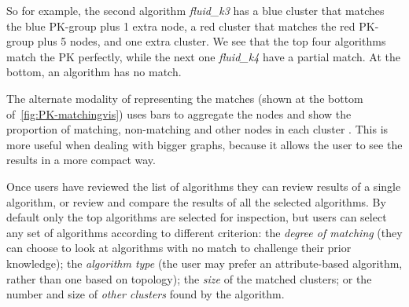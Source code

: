 So for example, the second algorithm \emph{fluid\_k3} has a blue cluster that matches the blue PK-group plus 1 extra node, a red cluster that matches the red PK-group plus 5 nodes, and one extra cluster.  We see that the top four algorithms match the PK perfectly, while the next one \emph{fluid\_k4}  have a partial match. At the bottom, an algorithm has no match.

The alternate modality of representing the matches (shown at the bottom of~\autoref{fig:PK-matchingvis}) uses bars to aggregate the nodes and show the proportion of matching, non-matching and other nodes in each cluster . This is more useful when dealing with bigger graphs, because it allows the user to see the results in a more compact way.








Once users have reviewed the list of algorithms they can review results of a single algorithm, or review and compare the results of all the selected algorithms.
By default only the top algorithms are selected for inspection, but users can select any set of algorithms according to different criterion:
the \textit{degree of matching} (\ie they can choose to look at algorithms with no match to challenge their prior knowledge);
the \textit{algorithm type} (the user may prefer an attribute-based algorithm, rather than one based on topology);
the \textit{size} of the matched clusters;
or the number and size of \textit{other clusters} found by the algorithm.

